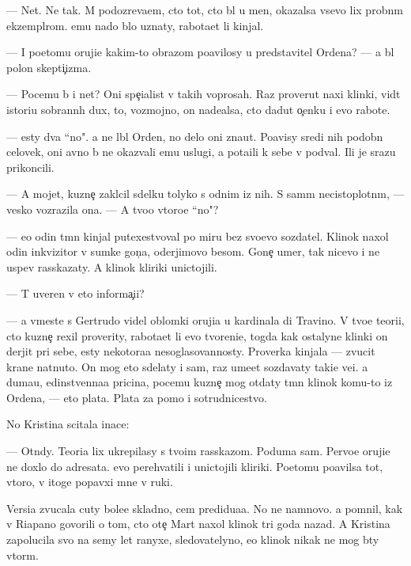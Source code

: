 \documentclass[10pt]{book}
\begin{document}
— Net. Ne tak. M{\yi} podozreva{\y}em, cto tot, cto b{\yi}l u men{\ia}, okazalsa vsevo lix probn{\yi}m ekzempl{\ia}rom. {\Y}emu nado b{\yi}lo uznaty, rabota{\y}et li kinjal.

— I poetomu oruji{\y}e kakim-to obrazom po{\y}avilosy u predstavitel{\ia} Ordena? — {\Y}a b{\yi}l polon skepti{\c}izma.

— Pocemu b{\yi} i net? Oni spe{\c}ialist{\yi} v takih voprosah. Raz prover{\ia}{\y}ut naxi klinki, vid{\ia}t istori{\y}u sobrann{\yi}h dux, to, vozmojno, on nade{\y}alsa, cto dadut o{\c}enku i {\y}evo rabote.

— {\Y}esty dva ``no". {\Y}a ne l{\iu}bl{\iu} Orden, no delo oni zna{\y}ut. Po{\y}avisy sredi nih podobn{\yi}{\y} celovek, oni {\y}avno b{\yi} ne okaz{\yi}vali {\y}emu uslugi, a pota{\x}ili k sebe v podval{\yi}. Ili je srazu prikoncili.

— A mojet, kuzne{\c} zakl{\iu}cil sdelku tolyko s odnim iz nih. S sam{\yi}m necistoplotn{\yi}m, — vesko vozrazila ona. — A tvo{\y}o vtoro{\y}e ``no"?

— {\Y}e{\x}o odin t{\e}mn{\yi}{\y} kinjal putexestvoval po miru bez svo{\y}evo sozdatel{\ia}. Klinok naxol odin inkvizitor v sumke gon{\c}a, oderjimovo besom. Gone{\c} umer, tak nicevo i ne uspev rasskazaty. A klinok kliriki unictojili.

— T{\yi} uveren v eto{\y} informa{\c}i{\y}i?

— {\Y}a vmeste s Gertrudo{\y} videl oblomki oruji{\y}a u kardinala di Travino. V tvo{\y}e{\y} teori{\y}i, cto kuzne{\c} rexil proverity, rabota{\y}et li {\y}evo tvoreni{\y}e, togda kak ostalyn{\yi}{\y}e klinki on derjit pri sebe, {\y}esty nekotora{\y}a nesoglasovannosty. Proverka kinjala — zvucit kra{\y}ne nat{\ia}nuto. On mog eto sdelaty i sam, raz ume{\y}et sozdavaty taki{\y}e ve{\x}i. {\Y}a duma{\y}u, {\y}edinstvenna{\y}a pricina, pocemu kuzne{\c} mog otdaty t{\e}mn{\yi}{\y} klinok komu-to iz Ordena, — eto plata. Plata za pomo{\x} i sotrudnicestvo.

No Kristina scitala inace:

— Otn{\iu}dy. Teori{\y}a lix ukrepilasy s tvo{\y}im rasskazom. Poduma{\y} sam. Pervo{\y}e oruji{\y}e ne doxlo do adresata. {\Y}evo perehvatili i unictojili kliriki. Poetomu po{\y}avilsa tot, vtoro{\y}, v itoge popavxi{\y} mne v ruki.

Versi{\y}a zvucala cuty bole{\y}e skladno, cem predidu{\x}a{\y}a. No ne namnovo. {\Y}a pomnil, kak v Riapano govorili o tom, cto ote{\c} Mart naxol klinok tri goda nazad. A Kristina zapolucila svo{\y} na semy let ranyxe, sledovatelyno, {\y}e{\y}o klinok nikak ne mog b{\yi}ty vtor{\yi}m.
\end{document}

